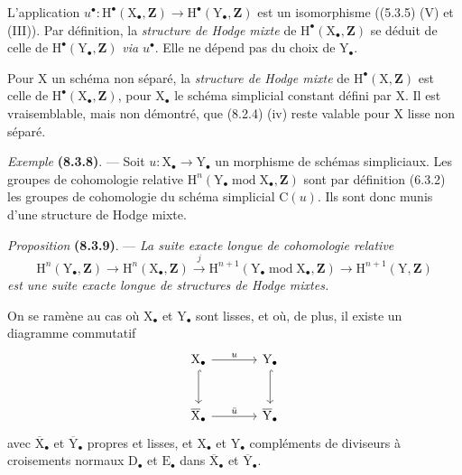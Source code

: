 \documentclass[11pt,leqno]{article}
\begin{document}
L’application \(u^\bullet:\mathrm{H}^\bullet(\mathrm{X}_\bullet,\mathbf{Z})\to\mathrm{H}^\bullet(\mathrm{Y}_\bullet,\mathbf{Z})\) est un isomorphisme ((5.3.5) (V) et (III)). Par définition, la \textit{structure de Hodge mixte} de \(\mathrm{H}^\bullet(\mathrm{X}_\bullet,\mathbf{Z})\) se déduit de celle de \(\mathrm{H}^\bullet(\mathrm{Y}_\bullet,\mathbf{Z})\) \textit{via} \(u^\bullet\). Elle ne dépend pas du choix de \(\mathrm{Y}_\bullet\).

Pour \(\mathrm{X}\) un schéma non séparé, la \textit{structure de Hodge mixte} de \(\mathrm{H}^\bullet(\mathrm{X},\mathbf{Z})\) est celle de \(\mathrm{H}^\bullet(\mathrm{X}_\bullet,\mathbf{Z})\), pour \(\mathrm{X}_\bullet\) le schéma simplicial constant défini par \(\mathrm{X}\). Il est vraisemblable, mais non démontré, que (8.2.4) (iv) reste valable pour \(\mathrm{X}\) lisse non séparé.

\textit{Exemple} \textbf{(8.3.8)}. — Soit \(u:\mathrm{X}_\bullet\to\mathrm{Y}_\bullet\) un morphisme de schémas simpliciaux. Les groupes de cohomologie relative \(\mathrm{H}^n(\mathrm{Y}_\bullet\operatorname{mod}\mathrm{X}_\bullet,\mathbf{Z})\) sont par définition (6.3.2) les groupes de cohomologie du schéma simplicial \(\mathrm{C}(u)\). Ils sont donc munis d’une structure de Hodge mixte.

\textit{Proposition} \textbf{(8.3.9)}. — \textit{La suite exacte longue de cohomologie relative}
\[
\mathrm{H}^n(\mathrm{Y}_\bullet,\mathbf{Z})
\to\mathrm{H}^n(\mathrm{X}_\bullet,\mathbf{Z})
\xrightarrow{j}
\mathrm{H}^{n+1}(\mathrm{Y}_\bullet\operatorname{mod}\mathrm{X}_\bullet,\mathbf{Z})
\to\mathrm{H}^{n+1}(\mathrm{Y},\mathbf{Z})
\]
\textit{est une suite exacte longue de structures de Hodge mixtes.}

On se ramène au cas où \(\mathrm{X}_\bullet\) et \(\mathrm{Y}_\bullet\) sont lisses, et où, de plus, il existe un diagramme commutatif
\[
\begin{tikzcd}[column sep=large,row sep=large]
\mathrm{X}_\bullet \arrow[r,"u"] \arrow[d,hook]
 & \mathrm{Y}_\bullet \arrow[d,hook]\\
\overline{\mathrm{X}}_\bullet \arrow[r,"\bar{u}"]
 & \overline{\mathrm{Y}}_\bullet
\end{tikzcd}
\]
avec \(\overline{\mathrm{X}}_\bullet\) et \(\overline{\mathrm{Y}}_\bullet\) propres et lisses, et \(\mathrm{X}_\bullet\) et \(\mathrm{Y}_\bullet\) compléments de diviseurs à croisements normaux \(\mathrm{D}_\bullet\) et \(\mathrm{E}_\bullet\) dans \(\overline{\mathrm{X}}_\bullet\) et \(\overline{\mathrm{Y}}_\bullet\).
\end{document}
